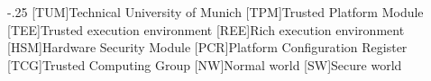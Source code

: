 \documentclass[headsepline,footsepline,footinclude=false,oneside,fontsize=11pt,paper=a4,listof=totoc,bibliography=totoc]{scrbook} %
\begin{document}


\frontmatter{}





\tableofcontents{}

\mainmatter{}

%




\appendix{}


\begin{acronym}
	\itemsep-.25\baselineskip
	[TUM]{Technical University of Munich}
	[TPM]{Trusted Platform Module}
	[TEE]{Trusted execution environment}
	[REE]{Rich execution environment}
	[HSM]{Hardware Security Module}
	[PCR]{Platform Configuration Register}
	[TCG]{Trusted Computing Group}
	[NW]{Normal world}
	[SW]{Secure world}
\end{acronym}

\listoffigures{}
\listoftables{}
\printbibliography{}
\end{document}
